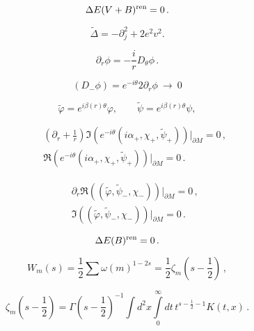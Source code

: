 \documentclass[]{article}
\begin{document}
\begin{equation}
	\Delta E(V+B)^{\rm ren} =0 \,.\label{1term}
\end{equation}

\begin{equation}
	\tilde \Delta =-\partial_j^2 +2e^2v^2.\label{asop}
\end{equation}

\begin{equation}
	\partial_r \phi =-\frac ir D_\theta \phi \,.
\end{equation}

\begin{equation}
	(D_-\phi )= e^{-i\theta} 2 \partial_r \phi \ {\to}\ 0
\end{equation}

\begin{equation}
	\tilde \varphi =e^{i\beta(r) \theta} \varphi,\qquad
	\tilde \psi =e^{i\beta(r) \theta} \psi,\label{tilfiel}
\end{equation}

\begin{eqnarray}
	&&\left( \partial_r +\frac 1r \right) \Im 
	\left( e^{-i\theta} (i\alpha_+,\chi_+,\tilde\psi_+) \right) 
	\vert_{\partial M}=
	0\,,\nonumber\\
	&&\Re \left( e^{-i\theta} (i\alpha_+,\chi_+,\tilde\psi_+) \right) 
	\vert_{\partial M}=0\,.\label{effbc1}
\end{eqnarray}

\begin{eqnarray}
	&&\partial_r \Re \left( (\tilde\varphi,\tilde\psi_-,\chi_-) \right)
	\vert_{\partial M}=
	0\,,\nonumber\\
	&&\Im \left( (\tilde\varphi,\tilde\psi_-,\chi_-) \right)
	\vert_{\partial M}=0 \,.\label{effbc2}
\end{eqnarray}

\begin{equation}
	\Delta E (B)^{\rm ren}=0 \,.\label{DEBren}
\end{equation}

\begin{equation}
	W_m(s)=\frac 12 \sum \omega (m)^{1-2s} = \frac 12 \zeta_m \left(
	s-\frac 12\right) \,, \label{mW}
\end{equation}

\begin{equation}
	\zeta_m \left( s-\frac 12\right)= \Gamma \left( s-\frac
	12\right)^{-1} \int d^2x \int\limits_0^\infty dt\, t^{s-\frac 12
		-1} K(t,x) \,.\label{zmKt}
\end{equation}
\end{document}
